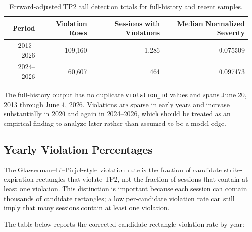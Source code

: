 \documentclass[11pt]{article}
\begin{document}
\begin{table}[h]
\centering
\begin{tabular}{rrrr}
\toprule
Period & Violation Rows & Sessions with Violations & Median Normalized Severity \\
\midrule
2013--2026 & 109,160 & 1,286 & 0.075509 \\
2024--2026 & 60,607 & 464 & 0.097473 \\
\bottomrule
\end{tabular}
\caption{Forward-adjusted TP2 call detection totals for full-history and recent samples.}
\end{table}

The full-history output has no duplicate \texttt{violation\_id} values and spans
June 20, 2013 through June 4, 2026. Violations are sparse in early years and
increase substantially in 2020 and again in 2024--2026, which should be treated
as an empirical finding to analyze later rather than assumed to be a model edge.

\subsection*{Yearly Violation Percentages}

The Glasserman--Li--Pirjol-style violation rate is the fraction of candidate
strike-expiration rectangles that violate TP2, not the fraction of sessions that
contain at least one violation. This distinction is important because each
session can contain thousands of candidate rectangles; a low per-candidate
violation rate can still imply that many sessions contain at least one
violation.

The table below reports the corrected candidate-rectangle violation rate by
year:
\end{document}
